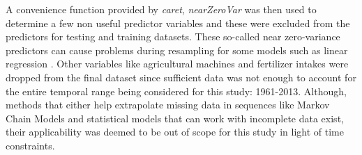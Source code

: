 \documentclass[conference]{IEEEtran}
\begin{document}
A convenience function provided by \textit{caret}, \textit{nearZeroVar} was then used to determine a few non useful predictor variables and these were excluded from the predictors for testing and training datasets. These so-called near zero-variance predictors can cause problems during resampling for some models such as linear regression \cite{Kuhn2008}. Other variables like agricultural machines and fertilizer intakes were dropped from the final dataset since sufficient data was not enough to account for the entire temporal range being considered for this study: 1961-2013. Although, methods that either help extrapolate missing data in sequences like Markov Chain Models and statistical models that can work with incomplete data exist, their applicability was deemed to be out of scope for this study in light of time constraints. 
\begin{table}[!htbp] \centering 
{}
  \caption{Sample rows from the data frame} 
  \label{tab:headdat} 
\end{table} 
\end{document}
